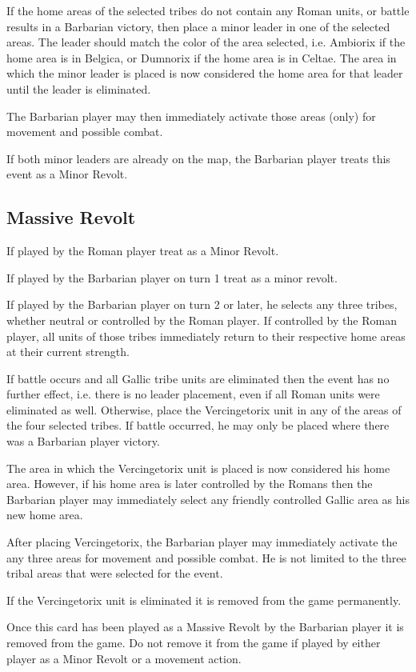 If the home areas of the selected tribes do not contain any Roman units, or battle results in a Barbarian victory, then place a minor leader in one of the selected areas. The leader should match the color of the area selected, i.e. Ambiorix if the home area is in Belgica, or Dumnorix if the home area is in Celtae. The area in which the minor leader is placed is now considered the home area for that leader until the leader is eliminated.

The Barbarian player may then immediately activate those areas (only) for movement and possible combat.

If both minor leaders are already on the map, the Barbarian player treats this event as a Minor Revolt.

\subsection{Massive Revolt}
If played by the Roman player treat as a Minor Revolt.

If played by the Barbarian player on turn 1 treat as a minor revolt.

If played by the Barbarian player on turn 2 or later, he selects any three tribes, whether neutral or controlled by the Roman player. If controlled by the Roman player, all units of those tribes immediately return to their respective home areas at their current strength.

If battle occurs and all Gallic tribe units are eliminated then the event has no further effect, i.e. there is no leader placement, even if all Roman units were eliminated as well. Otherwise, place the Vercingetorix unit in any of the areas of the four selected tribes. If battle occurred, he may only be placed where there was a Barbarian player victory.

The area in which the Vercingetorix unit is placed is now considered his home area. However, if his home area is later controlled by the Romans then the Barbarian player may immediately select any friendly controlled
Gallic area as his new home area.

After placing Vercingetorix, the Barbarian player may immediately activate the any three areas for movement and possible combat. He is not limited to the three tribal areas that were selected for the event. 

If the Vercingetorix unit is eliminated it is removed from the game permanently.

Once this card has been played as a Massive Revolt by the Barbarian player it is removed from the game. Do not remove it from the game if played by either player as a Minor Revolt or a movement action.